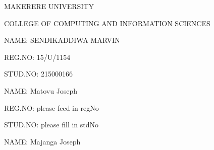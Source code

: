 \documentclass[14pt, a4paper]{article}
\begin{document}
		

		\begin{center} \begin{Huge}  MAKERERE UNIVERSITY \end{Huge} \end{center} 

		 \begin{center}\begin{Huge}  COLLEGE OF COMPUTING AND INFORMATION SCIENCES    \end{Huge} \end{center}
	




		\begin{flushleft} \begin{huge} NAME: SENDIKADDIWA MARVIN   \end{huge} \end{flushleft}

		\begin{flushleft} \begin{huge} REG.NO: 15/U/1154   \end{huge} \end{flushleft}

		\begin{flushleft} \begin{huge} STUD.NO: 215000166    \end{huge} \end{flushleft}
		
		
				\begin{flushleft} \begin{huge} NAME: Matovu Joseph   \end{huge} \end{flushleft}

		\begin{flushleft} \begin{huge} REG.NO: please feed in regNo   \end{huge} \end{flushleft}

		\begin{flushleft} \begin{huge} STUD.NO: please fill in stdNo    \end{huge} \end{flushleft}
		
		

		\begin{flushleft} \begin{huge} NAME: Majanga Joseph   \end{huge} \end{flushleft}
\end{document}
